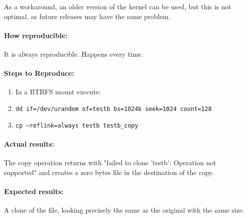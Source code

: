 As a workaround, an older version of the kernel can be used, but this is not optimal, as future releases may have the same problem.

\paragraph{How reproducible:}

It is always reproducible. Happens every time.

\paragraph{Steps to Reproduce:}

\begin{enumerate}
	\item In a BTRFS mount execute:
	\item \texttt{dd if=/dev/urandom of=testb bs=1024k seek=1024 count=128}
	\item \texttt{cp --reflink=always testb testb\_copy}
\end{enumerate}

\paragraph{Actual results:}
The copy operation returns with "failed to clone 'testb': Operation not supported" and creates a zero bytes file in the destination of the copy.

\paragraph{Expected results:}

A clone of the file, looking precisely the same as the original with the same size.

